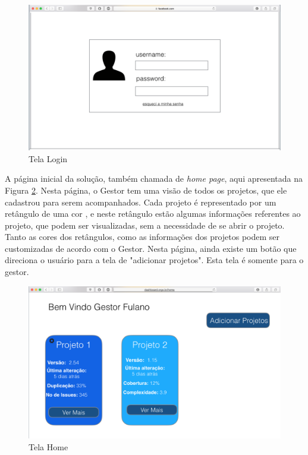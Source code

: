 \graphicspath{{figuras/}}
\begin{figure}
\centering
\includegraphics[scale=0.60]{telaLogin.png}
\caption{Tela Login}
\label{img:telaLogin}
\end{figure}

A página inicial da solução, também chamada de \textit{home page}, aqui apresentada na Figura \ref{img:telaHome}. Nesta página, o Gestor tem uma visão de todos os projetos, que ele cadastrou para serem acompanhados. Cada projeto é representado por um retângulo de uma cor , e neste retângulo estão algumas informações referentes ao projeto, que podem ser visualizadas, sem a necessidade de se abrir o projeto. Tanto as cores dos retângulos, como as informações dos projetos podem ser customizadas de acordo com o Gestor. Nesta página, ainda existe um botão que direciona o usuário para a tela de "adicionar projetos". Esta tela é somente para o gestor.
 
\graphicspath{{figuras/}}
\begin{figure}
\centering
\includegraphics[scale=0.60]{telaHome2.png}
\caption{Tela Home}
\label{img:telaHome}
\end{figure} 

